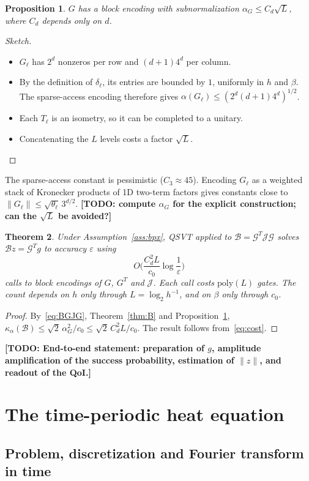 \documentclass[11pt,a4paper]{article}
\newcommand{\B}{\mathcal{B}}
\newcommand{\G}{\mathcal{G}}
\newcommand{\J}{\mathcal{J}}
\newcommand{\todo}[1]{\textbf{[TODO: #1]}}
\newtheorem{theorem}{Theorem}[section]
\newtheorem{proposition}[theorem]{Proposition}
\theoremstyle{remark}
\begin{document}
\begin{proposition}\label{prop:alphaG}
$G$ has a block encoding with subnormalization $\alpha_G\le C_d\sqrt L$, where
$C_d$ depends only on $d$.
\end{proposition}
\begin{proof}[Sketch]
\begin{itemize}
\item $G_\ell$ has $2^d$ nonzeros per row and $(d+1)4^d$ per column.
\item By the definition of $\delta_\ell$, its entries are bounded by $1$,
  uniformly in $h$ and $\beta$. The sparse-access encoding therefore gives
  $\alpha(G_\ell)\le(2^d(d+1)4^d)^{1/2}$.
\item Each $T_\ell$ is an isometry, so it can be completed to a unitary.
\item Concatenating the $L$ levels costs a factor $\sqrt L$.
\end{itemize}
\end{proof}
The sparse-access constant is pessimistic ($C_3\approx45$). Encoding $G_\ell$ as
a weighted stack of Kronecker products of 1D two-term factors gives
constants close to $\|G_\ell\|\le\sqrt{\theta_\ell}\,3^{d/2}$. \todo{compute
$\alpha_G$ for the explicit construction; can the $\sqrt L$ be avoided?}

\begin{theorem}\label{thm:main}
Under Assumption~\ref{ass:bpx}, QSVT applied to $\B=\G^T\J\G$ solves
$\B z=\G^Tg$ to accuracy $\varepsilon$ using
\[
O\Big(\frac{C_d^2L}{c_0}\log\frac1\varepsilon\Big)
\]
calls to block encodings of $G$, $G^T$ and $\J$. Each call costs
$\mathrm{poly}(L)$ gates. The count depends on $h$ only through $L=\log_2h^{-1}$, and
on $\beta$ only through $c_0$.
\end{theorem}
\begin{proof}
By~\eqref{eq:BGJG}, Theorem~\ref{thm:B} and Proposition~\ref{prop:alphaG},
$\kappa_\alpha(\B)\le\sqrt2\,\alpha_G^2/c_0\le\sqrt2\,C_d^2L/c_0$. The result follows
from~\eqref{eq:cost}.
\end{proof}
\noindent\todo{End-to-end statement: preparation of $g$, amplitude
amplification of the success probability, estimation of $\|z\|$, and readout
of the QoI.}

\section{The time-periodic heat equation}\label{sec:heat}

\subsection{Problem, discretization and Fourier transform in time}
\end{document}
